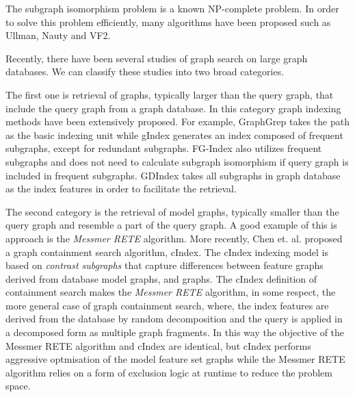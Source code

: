 The subgraph isomorphism problem is a known  NP-complete problem\cite{cook1971_np}.
In order to solve this problem efficiently, many algorithms have been proposed such as Ullman\cite{ullmann1976}, Nauty\cite{mckay1981} and VF2\cite{cordella2001_vf2}.

Recently, there have been several studies of graph search on large graph databases. We can classify these studies into two broad categories.

The first one is retrieval of graphs, typically larger than the query graph, that include the query graph from a graph database. 
In this category graph indexing methods have been extensively proposed. 
For example, GraphGrep\cite{shasha_wang_giugno2002_grapgrep} takes the path as the basic indexing unit while gIndex\cite{yan_yu_han2004_gindex} generates an index composed of frequent subgraphs, except for redundant subgraphs. 
FG-Index\cite{cheng2007_fgindex} also utilizes frequent subgraphs and does not need to calculate subgraph isomorphism if query graph is included in frequent subgraphs.
GDIndex\cite{williams_huan_wang2007_gdindex} takes all subgraphs in graph database as the index features in order to facilitate the retrieval.

The second category is the retrieval of model graphs, typically smaller than the query graph and resemble a part of the query graph. 
A good  example of this is approach is the \textit{Messmer RETE} algorithm\cite{messmer_bunke2000}. More recently, Chen et. al. proposed a graph containment search algorithm, cIndex\cite{chen2007_cindex}. 
The cIndex indexing model is based on  \textit{contrast subgraphs} that capture differences between feature graphs derived from database model graphs, and graphs. 
The cIndex definition of containment search makes the \textit{Messmer RETE} algorithm, in some respect, the more general case of graph containment search, where, the index features are derived from the database by random decomposition and the query is applied in a decomposed form as multiple graph fragments. 
In this way the objective of the Messmer RETE algorithm and cIndex are identical, but cIndex performs aggressive optmisation of the model feature set graphs while the Messmer RETE algorithm relies on a form of  exclusion logic at runtime to reduce the problem space.
